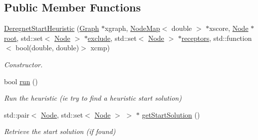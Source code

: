 \subsection*{Public Member Functions}
\begin{DoxyCompactItemize}
\item 
\hyperlink{classderegnet_1_1DeregnetStartHeuristic_af7fa694b10f54c669fce9431214ffc98}{Deregnet\+Start\+Heuristic} (\hyperlink{namespacederegnet_a55b76c55bbabc682cbc61f8b9948799e}{Graph} $\ast$xgraph, \hyperlink{namespacederegnet_ae102b707ae1d6f83c639ece5e0dd5658}{Node\+Map}$<$ double $>$ $\ast$xscore, \hyperlink{namespacederegnet_a744bad34f2de9856d36715a445f027f3}{Node} $\ast$\hyperlink{classderegnet_1_1DeregnetStartHeuristic_a4605d41352e3adf1f9f9f32466a4e61e}{root}, std\+::set$<$ \hyperlink{namespacederegnet_a744bad34f2de9856d36715a445f027f3}{Node} $>$ $\ast$\hyperlink{classderegnet_1_1DeregnetStartHeuristic_aa22c6581cd404bf7ac325850b28dc951}{exclude}, std\+::set$<$ \hyperlink{namespacederegnet_a744bad34f2de9856d36715a445f027f3}{Node} $>$ $\ast$\hyperlink{classderegnet_1_1DeregnetStartHeuristic_ab80c046ff2b7c64086fceb84987b3e50}{receptors}, std\+::function$<$ bool(double, double)$>$ xcmp)
\begin{DoxyCompactList}\small\item\em Constructor. \end{DoxyCompactList}\item 
bool \hyperlink{classderegnet_1_1DeregnetStartHeuristic_aa2afcafa3d3838a7e7b05faf586954e8}{run} ()
\begin{DoxyCompactList}\small\item\em Run the heuristic (ie try to find a heuristic start solution) \end{DoxyCompactList}\item 
std\+::pair$<$ \hyperlink{namespacederegnet_a744bad34f2de9856d36715a445f027f3}{Node}, std\+::set$<$ \hyperlink{namespacederegnet_a744bad34f2de9856d36715a445f027f3}{Node} $>$ $>$ $\ast$ \hyperlink{classderegnet_1_1DeregnetStartHeuristic_aacc20eaced32a65e78fcc18e56f966cc}{get\+Start\+Solution} ()
\begin{DoxyCompactList}\small\item\em Retrieve the start solution (if found) \end{DoxyCompactList}\end{DoxyCompactItemize}
